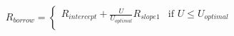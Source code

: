 \documentclass[preview]{standalone}
\begin{document}
\begin{align*}
{R_{borrow} = \begin{cases} R_{intercept} + \frac{U}{U_{optimal}}R_{slope1} & \text{if } U \leq U_{optimal} \\ \text{} \end{cases}}
\end{align*}
\end{document}
